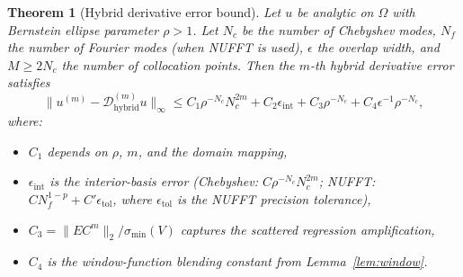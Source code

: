 \documentclass[sn-mathphys,Numbered]{sn-jnl}
\theoremstyle{thmstyleone}
\newtheorem{theorem}{Theorem}
\theoremstyle{thmstyletwo}
\theoremstyle{thmstylethree}
\newcommand{\calD}{\mathcal{D}}
\newcommand{\hybrid}{\mathrm{hybrid}}
\begin{document}
\begin{theorem}[Hybrid derivative error bound]\label{thm:error}
Let $u$ be analytic on $\Omega$ with Bernstein ellipse parameter $\rho>1$. Let $N_c$ be the number of Chebyshev modes, $N_f$ the number of Fourier modes (when NUFFT is used), $\epsilon$ the overlap width, and $M\geq 2N_c$ the number of collocation points. Then the $m$-th hybrid derivative error satisfies
\begin{equation}
    \|u^{(m)}-\calD_{\hybrid}^{(m)}u\|_\infty
    \leq C_1\rho^{-N_c}N_c^{2m}
    + C_2\epsilon_{\mathrm{int}}
    + C_3\rho^{-N_c}
    + C_4\epsilon^{-1}\rho^{-N_c},
    \label{eq:hybrid_error}
\end{equation}
where:
\begin{itemize}
    \item $C_1$ depends on $\rho$, $m$, and the domain mapping,
    \item $\epsilon_{\mathrm{int}}$ is the interior-basis error (Chebyshev: $C\rho^{-N_c}N_c^{2m}$; NUFFT: $CN_f^{1-p}+C'\epsilon_{\mathrm{tol}}$, where $\epsilon_{\mathrm{tol}}$ is the NUFFT precision tolerance),
    \item $C_3=\|EC^m\|_2/\sigma_{\min}(V)$ captures the scattered regression amplification,
    \item $C_4$ is the window-function blending constant from Lemma~\ref{lem:window}.
\end{itemize}
\end{theorem}
\end{document}
